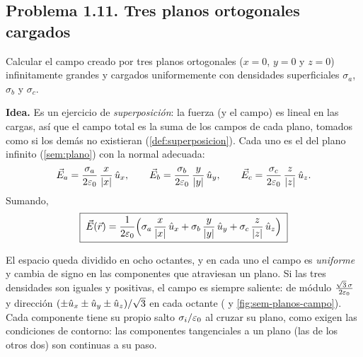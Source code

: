 

\subsection{Problema 1.11. Tres planos ortogonales cargados}\label{sem:planos}
\begin{ejercicio}\label{ejer:planos}
Calcular el campo creado por tres planos ortogonales ($x=0$, $y=0$ y $z=0$) infinitamente grandes y cargados uniformemente con densidades superficiales $\sigma_a$, $\sigma_b$ y $\sigma_c$.
\end{ejercicio}

\begin{resolucion}
\textbf{Idea.} Es un ejercicio de \emph{superposición}: la fuerza (y el campo) es lineal en las cargas, así que el campo total es la suma de los campos de cada plano, tomados como si los demás no existieran (\cref{def:superposicion}). Cada uno es el
del plano infinito (\cref{sem:plano}) con la normal adecuada:
\[
  \vec{E}_a=\frac{\sigma_a}{2\varepsilon_{0}}\,\frac{x}{\lvert x\rvert}\,\hat{u}_{x},\qquad\vec{E}_b=\frac{\sigma_b}{2\varepsilon_{0}}\,\frac{y}{\lvert y\rvert}\,\hat{u}_{y},\qquad\vec{E}_c=\frac{\sigma_c}{2\varepsilon_{0}}\,\frac{z}{\lvert z\rvert}\,\hat{u}_{z} .
\]
Sumando,
\[
  \boxed{\;\vec{E}(\vec{r})=\frac{1}{2\varepsilon_{0}}\Bigl(\sigma_a\,\frac{x}{\lvert x\rvert}\,\hat{u}_{x}+\sigma_b\,\frac{y}{\lvert y\rvert}\,\hat{u}_{y}+\sigma_c\,\frac{z}{\lvert z\rvert}\,\hat{u}_{z}\Bigr)\;}
\]
\end{resolucion}

\begin{observacion}[Interpretación]
El espacio queda dividido en ocho octantes, y en cada uno el campo es \emph{uniforme} y cambia de signo en las componentes que atraviesan un plano. Si las tres densidades son iguales y positivas, el campo es siempre saliente: de módulo $\frac{\sqrt3\,\sigma}{2\varepsilon_{0}}$ y dirección
$(\pm\hat{u}_{x}\pm\hat{u}_{y}\pm\hat{u}_{z})/\sqrt3$ en cada octante ( y \cref{fig:sem-planos-campo}). Cada componente tiene su propio salto $\sigma_i/\varepsilon_{0}$ al cruzar su plano, como exigen las condiciones de contorno: las componentes tangenciales a un plano (las de los otros dos) son continuas a su paso.
\end{observacion}





